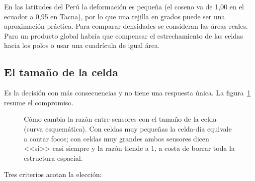 En las latitudes del Perú la deformación es pequeña (el coseno va de 1,00 en el ecuador a 0,95
en Tacna), por lo que una rejilla en grados puede ser una aproximación práctica. Para
comparar densidades se consideran las áreas reales. Para un producto global
habría que compensar el estrechamiento de las celdas hacia los polos o usar una cuadrícula de
igual área.

\subsection{El tamaño de la celda}

Es la decisión con más consecuencias y no tiene una respuesta única. La
figura~\ref{fig:tamano-celda} resume el compromiso.

\begin{figure}[ht]
\centering
{}
\caption{Cómo cambia la razón entre sensores con el tamaño de la celda (curva esquemática). Con
celdas muy pequeñas la celda-día equivale a contar focos; con celdas muy grandes ambos sensores
dicen <<sí>> casi siempre y la razón tiende a 1, a costa de borrar toda la estructura espacial.}
\label{fig:tamano-celda}
\end{figure}

Tres criterios acotan la elección:

